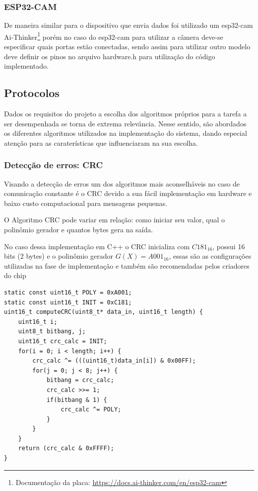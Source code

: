 \documentclass[
article,			%
12pt,				%
oneside,			%
a4paper,			%
english,			%
brazil,				%
sumario=tradicional
]{abntex2}
\begin{document}
\subsubsection{ESP32-CAM}\label{ESP32-CAM}
De maneira similar para o dispositivo que envia dados foi utilizado um esp32-cam Ai-Thinker\footnote{Documentação da placa: \url{https://docs.ai-thinker.com/en/esp32-cam}} porém no caso do esp32-cam para utilizar a câmera deve-se especificar quais portas estão conectadas, sendo assim para utilizar outro modelo deve definir os pinos no arquivo hardware.h para utilização do código implementado.

\cleardoublepage
\subsection{Protocolos}\label{Protocolos}

Dados os requisitos do projeto a escolha dos algoritmos próprios para a tarefa a ser desempenhada se torna de extrema relevância. Nesse sentido, são abordados os diferentes algoritmos utilizados na implementação do sistema, dando especial atenção para as caraterísticas que influenciaram na sua escolha.

\subsubsection{Detecção de erros: CRC}\label{CRC}

Visando a detecção de erros um dos algoritmos mais aconselháveis no caso de comunicação constante é o CRC devido a sua fácil implementação em hardware e baixo custo computacional para mensagens pequenas.

O Algoritmo CRC pode variar em relação: como iniciar seu valor, qual o polinômio gerador e quantos bytes gera na saída.

No caso dessa implementação em C++ o CRC inicializa com $C181_{16}$, possui 16 bits (2 bytes) e o polinômio gerador $G(X) = A001_{16}$, essas são as configurações utilizadas na fase de implementação e também são recomendadas pelos criadores do chip\cite{lora_radioenge}

\begin{lstlisting}[title=Algoritmo CRC 16 bits]
static const uint16_t POLY = 0xA001;
static const uint16_t INIT = 0xC181;
uint16_t computeCRC(uint8_t* data_in, uint16_t length) {
    uint16_t i;
    uint8_t bitbang, j;
    uint16_t crc_calc = INIT;
    for(i = 0; i < length; i++) {
        crc_calc ^= (((uint16_t)data_in[i]) & 0x00FF);
        for(j = 0; j < 8; j++) {
            bitbang = crc_calc;
            crc_calc >>= 1;
            if(bitbang & 1) {
                crc_calc ^= POLY;
            }
        }
    }
    return (crc_calc & 0xFFFF);
}
\end{lstlisting}
\end{document}
